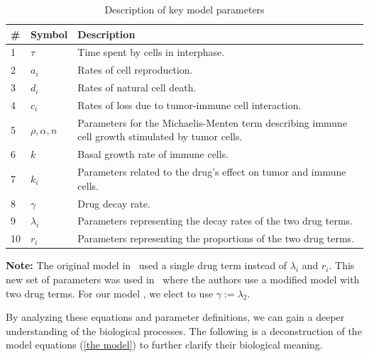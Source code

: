 \begin{table}[ht]
\centering
\begin{tabularx}{\textwidth}{@{} l l X @{}}
\toprule
\textbf{\#} & \textbf{Symbol} & \textbf{Description} \\ \midrule
1 & $\tau$ & Time spent by cells in interphase. \\
2 & $a_i$ & Rates of cell reproduction. \\
3 & $d_i$ & Rates of natural cell death. \\
4 & $c_i$ & Rates of loss due to tumor-immune cell interaction. \\
5 & $\rho, \alpha, n$ & Parameters for the \gls{Michaelis-Menten term} describing immune cell growth stimulated by tumor cells. \\
6 & $k$ & Basal growth rate of immune cells. \\
7 & $k_i$ & Parameters related to the drug's effect on tumor and immune cells. \\
8 & $\gamma$ & Drug decay rate. \\
9 & $\lambda_i$ & Parameters representing the decay rates of the two drug terms. \\
10 & $r_i$ & Parameters representing the proportions of the two drug terms. \\ \bottomrule
\end{tabularx}
\caption{Description of key model parameters}
\label{table:parameter descriptions}
\end{table}

\textbf{Note:} The original model in~\cite{villasana_delay_2003} used a single drug term instead of $\lambda_i$ and $r_i$. This new set of parameters was used in~\cite{villasana_heuristic_2004} where the authors use a modified model with two drug terms. For our model \cite{villasana_delay_2003}, we elect to use $ \gamma := \lambda_2$.

By analyzing these equations and parameter definitions, we can gain a deeper understanding of the biological processes. The following is a deconstruction of the model equations (\ref{the model}) to further clarify their biological meaning.

